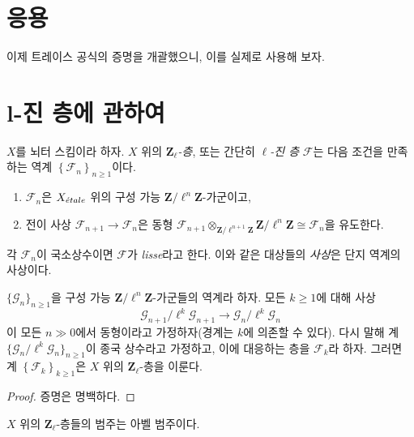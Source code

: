 \section{응용}
\label{section-applications}

\noindent
이제 트레이스 공식의 증명을 개괄했으니, 이를 실제로 사용해 보자.





\section{l-진 층에 관하여}
\label{section-l-adic-sheaves}

\begin{definition}
\label{definition-l-adic-sheaf}
$X$를 뇌터 스킴이라 하자. $X$ 위의 {\it
$\mathbf{Z}_\ell$-층}, 또는 간단히 {\it $\ell$-진 층}
$\mathcal{F}$는 다음 조건을 만족하는 역계
$\left\{\mathcal{F}_n\right\}_{n\geq 1}$이다.
\begin{enumerate}
\item
$\mathcal{F}_n$은 $X_{\acute{e}tale}$ 위의 구성 가능
$\mathbf{Z}/\ell^n\mathbf{Z}$-가군이고,
\item
전이 사상 $\mathcal{F}_{n+1}\to \mathcal{F}_n$은 동형
$\mathcal{F}_{n+1} \otimes_{\mathbf{Z}/\ell^{n+1}\mathbf{Z}}
\mathbf{Z}/\ell^n\mathbf{Z} \cong \mathcal{F}_n$을 유도한다.
\end{enumerate}
각 $\mathcal{F}_n$이 국소상수이면 $\mathcal{F}$가 {\it lisse}라고
한다. 이와 같은 대상들의 {\it 사상}은 단지 역계의 사상이다.
\end{definition}

\begin{lemma}
\label{lemma-eventually-constant}
$\{\mathcal{G}_n\}_{n\geq 1}$을 구성 가능
$\mathbf{Z}/\ell^n\mathbf{Z}$-가군들의 역계라 하자.
모든 $k\geq 1$에 대해 사상
$$
\mathcal{G}_{n+1}/\ell^k \mathcal{G}_{n+1}\to \mathcal{G}_n /\ell^k
\mathcal{G}_n
$$
이 모든 $n\gg 0$에서 동형이라고 가정하자(경계는 $k$에 의존할 수
있다). 다시 말해 계
$\{\mathcal{G}_n/\ell^k\mathcal{G}_n\}_{n\geq 1}$이 종국 상수라고
가정하고, 이에 대응하는 층을 $\mathcal{F}_k$라 하자. 그러면 계
$\left\{\mathcal{F}_k\right\}_{k\geq 1}$은 $X$ 위의
$\mathbf{Z}_\ell$-층을 이룬다.
\end{lemma}

\begin{proof}
증명은 명백하다.
\end{proof}

\begin{lemma}
\label{lemma-l-adic-abelian}
$X$ 위의 $\mathbf{Z}_\ell$-층들의 범주는 아벨 범주이다.
\end{lemma}

